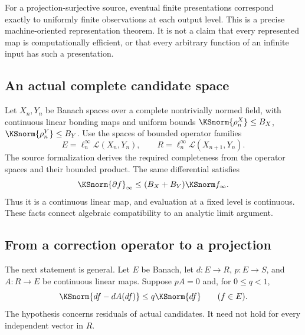 \begin{insight}
For a projection-surjective source, eventual finite presentations correspond exactly to uniformly finite observations at each output level. This is a precise machine-oriented representation theorem. It is not a claim that every represented map is computationally efficient, or that every arbitrary function of an infinite input has such a presentation.
\end{insight}



\label{KS:sec:split}
\subsection{An actual complete candidate space}
Let \(X_n,Y_n\) be Banach spaces over a complete nontrivially normed field, with continuous linear bonding maps and uniform bounds \(\KSnorm{\rho^X_n}\le B_X\), \(\KSnorm{\rho^Y_n}\le B_Y\). Use the spaces of bounded operator families
\[
 E=\ell^\infty_n\mathcal L(X_n,Y_n),\qquad
 R=\ell^\infty_n\mathcal L(X_{n+1},Y_n).
\]
The source formalization derives the required completeness from the operator spaces and their bounded product. The same differential satisfies
\[
 \KSnorm{\partial f}_\infty\le(B_X+B_Y)\KSnorm f_\infty.
\]
Thus it is a continuous linear map, and evaluation at a fixed level is continuous. These facts connect algebraic compatibility to an analytic limit argument.

\subsection{From a correction operator to a projection}
The next statement is general. Let \(E\) be Banach, let \(d:E\to R\), \(p:E\to S\), and \(A:R\to E\) be continuous linear maps. Suppose \(pA=0\) and, for \(0\le q<1\),
\begin{equation}\label{KS:eq:contraction}
 \KSnorm{df-dA(df)}\le q\KSnorm{df}\qquad(f\in E).
\end{equation}
The hypothesis concerns residuals of actual candidates. It need not hold for every independent vector in \(R\).

